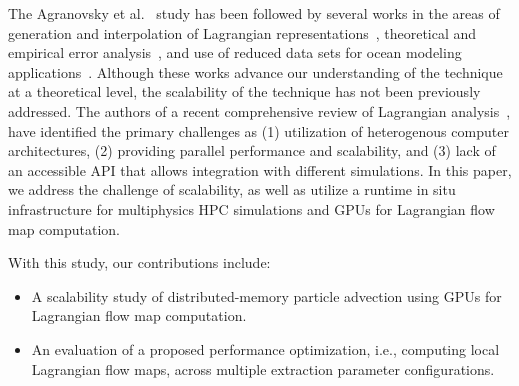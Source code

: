 The Agranovsky et al.~\cite{agranovsky2014improved} study has been followed by several works in the areas of generation and interpolation of Lagrangian representations~\cite{chandler2015interpolation, sane2019interpolation, rapp2019void, jakob2020fluid}, theoretical and empirical error analysis~\cite{bujack2015lagrangian, chandler2016analysis, hummel2016error, sane2018revisiting}, and use of reduced data sets for ocean modeling applications~\cite{envirvis.20171099}.
%
Although these works advance our understanding of the technique at a theoretical level, the scalability of the technique has not been previously addressed. 
%
%
The authors of a recent comprehensive review of Lagrangian analysis~\cite{VANSEBILLE201849}, have identified the primary challenges as (1) utilization of heterogenous computer architectures, (2) providing parallel performance and scalability, and (3) lack of an accessible API that allows integration with different simulations. 
%
In this paper, we address the challenge of scalability, as well as utilize a runtime in situ infrastructure for multiphysics HPC simulations and GPUs for Lagrangian flow map computation. 

With this study, our contributions include:
\vspace{-1mm}
\begin{itemize}[leftmargin=*,noitemsep,topsep=0pt,parsep=0pt,partopsep=0pt]
\item A scalability study of distributed-memory particle advection using GPUs for Lagrangian flow map computation. 
\item An evaluation of a proposed performance optimization, i.e., computing local Lagrangian flow maps, across multiple extraction parameter configurations.
\vspace{-1mm}
\end{itemize}

%
%

